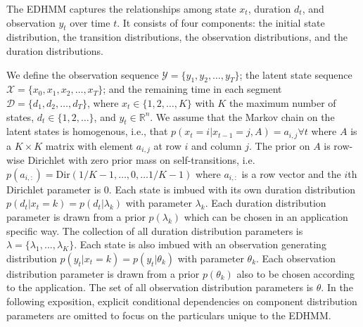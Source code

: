 The EDHMM captures the relationships among state $x_t$, duration $d_t$, and  observation $y_t$ over time $t$. It consists of four components: the initial state distribution, the transition distributions, the observation distributions, and the duration distributions. 

We define the observation sequence $\mathcal{Y} = \{y_1, y_2, \ldots, y_T\}$; the latent state sequence $\mathcal{X} = \{x_0, x_1, x_2, \ldots, x_T\}$; and the remaining time in each segment $\mathcal{D} = \{ d_1, d_2, \ldots, d_T\}$, where $x_t \in \{ 1, 2, \ldots, K\}$ with $K$ the maximum number of states, $d_t \in \{1, 2, \ldots \}$, and $y_t \in \mathbb{R}^n$.     We assume that the Markov chain on the latent states is homogenous, i.e., that $p(x_t = i | x_{t-1}=j, A) = a_{i,j} \forall t$ where $A$ is a $K\times K$ matrix with element $a_{i,j}$ at row $i$ and column $j.$  The prior on $A$ is row-wise Dirichlet with zero prior mass on self-transitions, i.e.  $p(a_{i,:}) = \mathrm{Dir}({1}/{K-1}, \ldots, 0 , \ldots {1}/{K-1})$ where $a_{i,:}$ is a row vector and the $i$th Dirichlet parameter is $0.$  Each state is imbued with its own duration distribution $p(d_t | x_t = k) = p(d_t | \lambda_{k})$ with parameter $\lambda_k$.  Each duration distribution parameter is drawn from a prior $p(\lambda_k)$ which can be chosen in an application specific way.  The collection of all duration distribution parameters is $\lambda = \{\lambda_1, \ldots, \lambda_K\}$.  Each state is also imbued with an observation generating distribution $p(y_t  | x_t = k) = p(y_t | \theta_{k})$ with parameter $\theta_k$.  Each observation distribution parameter is 
drawn from a prior $p(\theta_k)$ also to be chosen according to the application.   The set of all observation distribution parameters is $\theta.$  In the following exposition, explicit conditional dependencies on component distribution parameters are omitted to focus on the particulars unique to the EDHMM.

